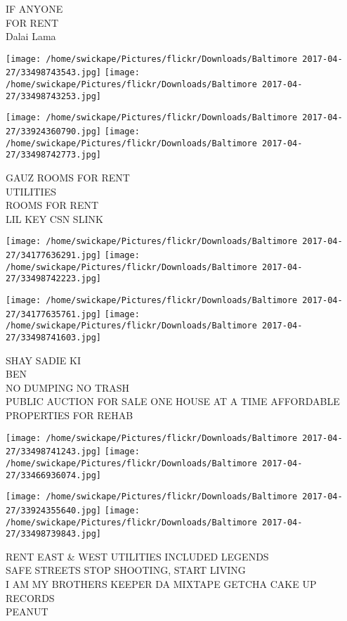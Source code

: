 \documentclass[10pt,letterpaper]{article}
\begin{document}
IF ANYONE\\
FOR RENT\\
Dalai Lama
\pagebreak

\texttt{[image: /home/swickape/Pictures/flickr/Downloads/Baltimore 2017-04-27/33498743543.jpg]}
\texttt{[image: /home/swickape/Pictures/flickr/Downloads/Baltimore 2017-04-27/33498743253.jpg]}

\texttt{[image: /home/swickape/Pictures/flickr/Downloads/Baltimore 2017-04-27/33924360790.jpg]}
\texttt{[image: /home/swickape/Pictures/flickr/Downloads/Baltimore 2017-04-27/33498742773.jpg]}

GAUZ ROOMS FOR RENT\\
UTILITIES\\
ROOMS FOR RENT\\
LIL KEY CSN SLINK
\pagebreak

\texttt{[image: /home/swickape/Pictures/flickr/Downloads/Baltimore 2017-04-27/34177636291.jpg]}
\texttt{[image: /home/swickape/Pictures/flickr/Downloads/Baltimore 2017-04-27/33498742223.jpg]}

\texttt{[image: /home/swickape/Pictures/flickr/Downloads/Baltimore 2017-04-27/34177635761.jpg]}
\texttt{[image: /home/swickape/Pictures/flickr/Downloads/Baltimore 2017-04-27/33498741603.jpg]}

SHAY SADIE KI\\
BEN\\
NO DUMPING NO TRASH\\
PUBLIC AUCTION FOR SALE ONE HOUSE AT A TIME AFFORDABLE PROPERTIES FOR REHAB
\pagebreak

\texttt{[image: /home/swickape/Pictures/flickr/Downloads/Baltimore 2017-04-27/33498741243.jpg]}
\texttt{[image: /home/swickape/Pictures/flickr/Downloads/Baltimore 2017-04-27/33466936074.jpg]}

\texttt{[image: /home/swickape/Pictures/flickr/Downloads/Baltimore 2017-04-27/33924355640.jpg]}
\texttt{[image: /home/swickape/Pictures/flickr/Downloads/Baltimore 2017-04-27/33498739843.jpg]}

RENT EAST \& WEST UTILITIES INCLUDED LEGENDS\\
SAFE STREETS STOP SHOOTING, START LIVING\\
I AM MY BROTHERS KEEPER DA MIXTAPE GETCHA CAKE UP RECORDS\\
PEANUT
\pagebreak
\end{document}
